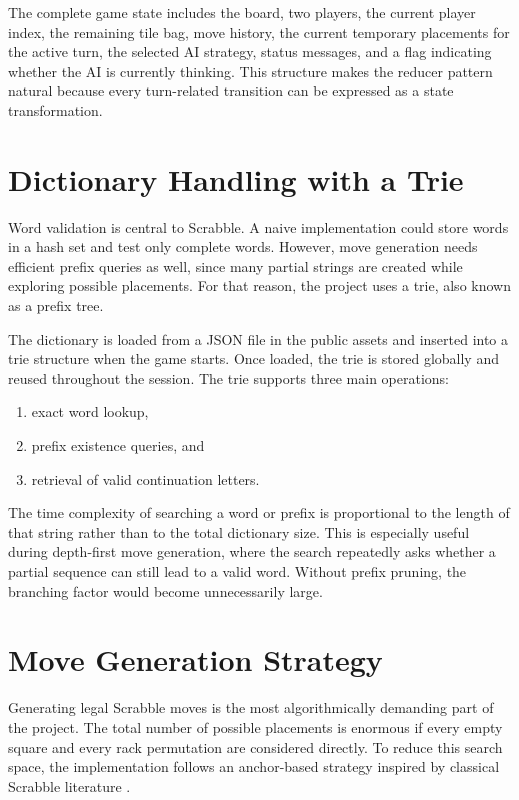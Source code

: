 \documentclass[conference]{IEEEtran}
\begin{document}
The complete game state includes the board, two players, the current player index, the remaining tile bag, move history, the current temporary placements for the active turn, the selected AI strategy, status messages, and a flag indicating whether the AI is currently thinking. This structure makes the reducer pattern natural because every turn-related transition can be expressed as a state transformation.

\section{Dictionary Handling with a Trie}
Word validation is central to Scrabble. A naive implementation could store words in a hash set and test only complete words. However, move generation needs efficient prefix queries as well, since many partial strings are created while exploring possible placements. For that reason, the project uses a trie, also known as a prefix tree.

The dictionary is loaded from a JSON file in the public assets and inserted into a trie structure when the game starts. Once loaded, the trie is stored globally and reused throughout the session. The trie supports three main operations:
\begin{enumerate}
\item exact word lookup,
\item prefix existence queries, and
\item retrieval of valid continuation letters.
\end{enumerate}

The time complexity of searching a word or prefix is proportional to the length of that string rather than to the total dictionary size. This is especially useful during depth-first move generation, where the search repeatedly asks whether a partial sequence can still lead to a valid word. Without prefix pruning, the branching factor would become unnecessarily large.

\section{Move Generation Strategy}
Generating legal Scrabble moves is the most algorithmically demanding part of the project. The total number of possible placements is enormous if every empty square and every rack permutation are considered directly. To reduce this search space, the implementation follows an anchor-based strategy inspired by classical Scrabble literature \cite{appel1988fastest,gordon1994faster}.
\end{document}
